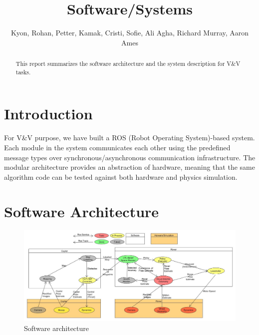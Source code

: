 \documentclass[conference]{IEEEtran}
\begin{document}

\title{\huge Software/Systems}

\author{Kyon, Rohan, Petter, Kamak, Cristi, Sofie, Ali Agha, Richard Murray, Aaron Ames}

\maketitle

\begin{abstract}
This report summarizes the software architecture and the system description for V\&V tasks. 
\end{abstract}

\IEEEpeerreviewmaketitle

	
\section{Introduction} \label{subsec:intro}

For V\&V purpose, we have built a ROS (Robot Operating System)-based system. Each module in the system communicates each other using the predefined message types over synchronous/asynchronous communication infrastructure. The modular architecture provides an abstraction of hardware, meaning that the same algorithm code can be tested against both hardware and physics simulation. 

\section{Software Architecture}

\begin{figure}
    \centering
    \includegraphics[width=\textwidth]{BeliefSpaceTemporalLogic/figs/SoftwareArch.jpg}
    \caption{Software architecture}
    \label{fig:software_arch}
\end{figure}
\end{document}
